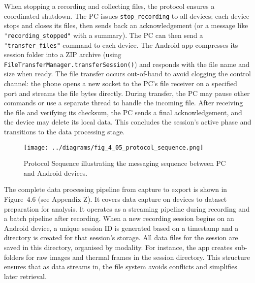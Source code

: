When stopping a recording and collecting files, the protocol ensures a coordinated shutdown. The PC issues \texttt{stop\_recording} to all devices; each device stops and closes its files, then sends back an acknowledgement (or a message like \texttt{"recording\_stopped"} with a summary). The PC can then send a \texttt{"transfer\_files"} command to each device. The Android app compresses its session folder into a ZIP archive (using \texttt{FileTransferManager.transferSession()}) and responds with the file name and size when ready. The file transfer occurs out-of-band to avoid clogging the control channel: the phone opens a new socket to the PC's file receiver on a specified port and streams the file bytes directly. During transfer, the PC may pause other commands or use a separate thread to handle the incoming file. After receiving the file and verifying its checksum, the PC sends a final acknowledgement, and the device may delete its local data. This concludes the session's active phase and transitions to the data processing stage.

\begin{figure}[htbp]
    \centring
    \texttt{[image: ../diagrams/fig\_4\_05\_protocol\_sequence.png]}
    \caption{Protocol Sequence illustrating the messaging sequence between PC and Android devices.}
    \label{fig:4_05_protocol_sequence}
\end{figure}

The complete data processing pipeline from capture to export is shown in Figure~4.6 (see Appendix Z). It covers data capture on devices to dataset preparation for analysis. It operates as a streaming pipeline during recording and a batch pipeline after recording. When a new recording session begins on an Android device, a unique session ID is generated based on a timestamp and a directory is created for that session's storage. All data files for the session are saved in this directory, organised by modality. For instance, the app creates sub-folders for raw images and thermal frames in the session directory. This structure ensures that as data streams in, the file system avoids conflicts and simplifies later retrieval.

